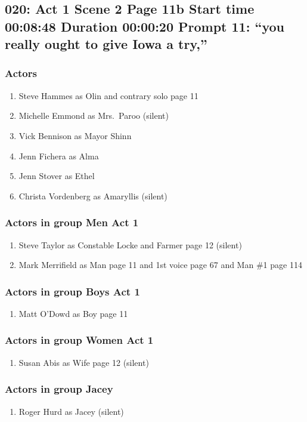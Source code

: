 \subsection{020: Act 1 Scene 2 Page 11b Start time 00:08:48 Duration 00:00:20 Prompt 11: ``you really ought to give Iowa a try,''}

\subsubsection{Actors}
\begin{enumerate}
\item Steve Hammes as Olin and contrary solo page 11
\item Michelle Emmond as Mrs.~Paroo (silent)
\item Vick Bennison as Mayor Shinn
\item Jenn Fichera as Alma
\item Jenn Stover as Ethel
\item Christa Vordenberg as Amaryllis (silent)
\end{enumerate}
\subsubsection{Actors in group Men Act 1}
\begin{enumerate}
\item Steve Taylor as Constable Locke and Farmer page 12 (silent)
\item Mark Merrifield as Man page 11 and 1st voice page 67 and Man \#1 page 114
\end{enumerate}
\subsubsection{Actors in group Boys Act 1}
\begin{enumerate}
\item Matt O'Dowd as Boy page 11
\end{enumerate}
\subsubsection{Actors in group Women Act 1}
\begin{enumerate}
\item Susan Abis as Wife page 12 (silent)
\end{enumerate}
\subsubsection{Actors in group Jacey}
\begin{enumerate}
\item Roger Hurd as Jacey (silent)
\end{enumerate}

